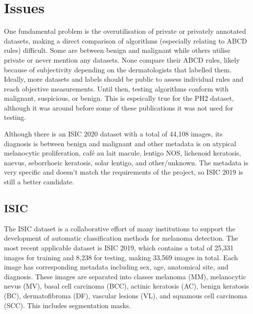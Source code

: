 \section{Issues}
One fundamental problem is the overutilisation of private or privately annotated datasets, making a direct comparison of algorithms (especially relating to ABCD rules) difficult. Some are between benign and malignant\cite{Meskini2018, Kasmi2016, Ali2020b, Ali2020a} while others utilise private or never mention any datasets\cite{Kasmi2016, She2007, Tenenhaus2010, Ramezani2014, Zaqout2016}. None compare their ABCD rules, likely because of subjectivity depending on the dermatologists that labelled them. Ideally, more datasets and labels should be public to assess individual rules and reach objective measurements. Until then, testing algorithms conform with malignant, suspicious, or benign. This is espeically true for the PH2 dataset, although it was around before some of these publications it was not used for testing.

Although there is an ISIC 2020 dataset with a total of 44,108 images, its diagnosis is between benign and malignant and other metadata is on atypical melanocytic proliferation, café au lait macule, lentigo NOS, lichenoid keratosis, naevus, seborrhoeic keratosis, solar lentigo, and other/unknown. The metadata is very specific and doesn't match the requirements of the project, so ISIC 2019 is still a better candidate.

\subsection{ISIC}
The ISIC dataset is a collaborative effort of many institutions to support the development of automatic classification methods for melanoma detection. The most recent applicable dataset is ISIC 2019, which contains a total of 25,331 images for training and 8,238 for testing, making 33,569 images in total. Each image has corresponding metadata including sex, age, anatomical site, and diagnosis. These images are separated into classes melanoma (MM), melanocytic nevus (MV), basal cell carcinoma (BCC), actinic keratosis (AC), benign keratosis (BC), dermatofibroma (DF), vascular lesions (VL), and squamous cell carcinoma (SCC). This includes segmentation masks.


